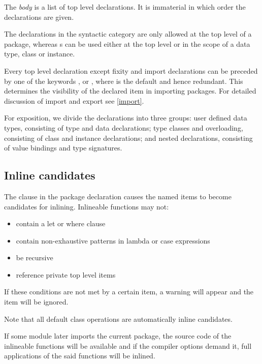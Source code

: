 
The \emph{body} is a list of top level declarations. It is immaterial in which order the declarations are given.

The declarations in the syntactic category  are only allowed at the top level of a \frege{} package, whereas s can be used either at the top level or in the scope of a data type, class or instance.

Every top level declaration except fixity and import declarations can be preceded by one of the keywords ,  or , where  is the default and hence redundant. This determines the visibility of the declared item in importing packages. For detailed discussion of import and export see \autoref{import}.

For exposition, we divide the declarations into three groups: user defined data types, consisting of type and data declarations; type classes and overloading, consisting of class and instance declarations; and nested declarations, consisting of value bindings and type signatures.

\subsection*{Inline candidates}

The  clause in the package declaration causes the named items to become candidates for inlining. Inlineable functions may not:

\begin{itemize}
\item contain a let or where clause
\item contain non-exhaustive patterns in lambda or case expressions
\item be recursive
\item reference private top level items
\end{itemize}

If these conditions are not met by a certain item, a warning will appear and the item will be ignored.

Note that all default class operations are automatically inline candidates.

If some module later imports the current package, the source code of the inlineable functions will be available and if the compiler options demand it, full applications of the said functions will be inlined.

